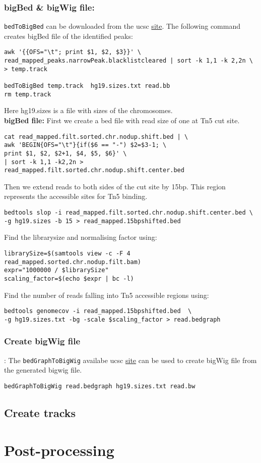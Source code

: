\documentclass[10pt]{article}
\newcommand{\prog}[1]{\texttt{#1}}
\begin{document}
\subsubsection{bigBed \& bigWig file:} \prog{bedToBigBed} can be downloaded from the ucsc \href{http://hgdownload.cse.ucsc.edu/admin/exe/}{site}. The following command creates bigBed file of the identified peaks:
\begin{verbatim}
awk '{{OFS="\t"; print $1, $2, $3}}' \
read_mapped_peaks.narrowPeak.blacklistcleared | sort -k 1,1 -k 2,2n \
> temp.track

bedToBigBed temp.track  hg19.sizes.txt read.bb
rm temp.track
\end{verbatim}
Here hg19.sizes is a file with sizes of the chromosomes.\\
\textbf{bigBed file:} First we create a bed file with read size of one at Tn5 cut site.
\begin{verbatim}
cat read_mapped.filt.sorted.chr.nodup.shift.bed | \
awk 'BEGIN{OFS="\t"}{if($6 == "-") $2=$3-1; \
print $1, $2, $2+1, $4, $5, $6}' \
| sort -k 1,1 -k2,2n >  read_mapped.filt.sorted.chr.nodup.shift.center.bed
\end{verbatim}
Then we extend reads to both sides of the cut site by 15bp. This region represents the accessible sites for Tn5 binding.
\begin{verbatim}
bedtools slop -i read_mapped.filt.sorted.chr.nodup.shift.center.bed \
-g hg19.sizes -b 15 > read_mapped.15bpshifted.bed
\end{verbatim}
Find the librarysize and normalising factor using:
\begin{verbatim}
librarySize=$(samtools view -c -F 4 read_mapped.sorted.chr.nodup.filt.bam)
expr="1000000 / $librarySize"
scaling_factor=$(echo $expr | bc -l)
\end{verbatim}
Find the number of reads falling into Tn5 accessible regions using:
\begin{verbatim}
bedtools genomecov -i read_mapped.15bpshifted.bed  \
-g hg19.sizes.txt -bg -scale $scaling_factor > read.bedgraph
\end{verbatim}
\subsubsection{Create bigWig file}: The \prog{bedGraphToBigWig} availabe ucsc \href{http://hgdownload.cse.ucsc.edu/admin/exe/}{site} can be used to create bigWig file from the generated bigwig file.
\begin{verbatim}
bedGraphToBigWig read.bedgraph hg19.sizes.txt read.bw
\end{verbatim}
\subsection{Create tracks}
\section{Post-processing}
\end{document}
